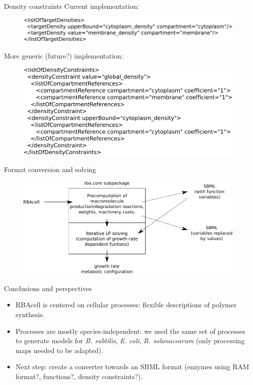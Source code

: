 \documentclass{beamer}
\begin{document}
\begin{frame}{Density constraints}
  Current implementation:
  \begin{figure}
    \centering
    \includegraphics[scale=0.7]{density}
  \end{figure}
  More generic (future?) implementation:
  \begin{figure}
    \centering
    \includegraphics[scale=0.7]{density_future}
  \end{figure}
\end{frame}

\begin{frame}{Format conversion and solving}
  \begin{figure}
    \centering
    \includegraphics[width=\linewidth]{solving}
  \end{figure}
\end{frame}

\begin{frame}{Conclusions and perspectives}
  \begin{itemize}
    \item RBAcell is centered on cellular processes: flexible descriptions
    of polymer synthesis.
    \item Processes are mostly species-independent: we used the same set of processes to
    generate models for \textit{B. subtilis}, \textit{E. coli}, \textit{R. solanacearum}
    (only processing maps needed to be adapted).
    \item Next step: create a converter towards an SBML format
    (enzymes using RAM format?, functions?, density constraints?).
  \end{itemize}
\end{frame}

\appendix
{}
\setcounter{finalframe}{\value{framenumber}}


\setcounter{framenumber}{\value{finalframe}}
\end{document}
